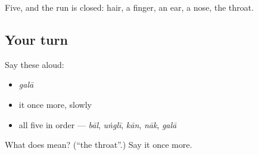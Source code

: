 \begin{grammarlens}[title={What you've built}]
Five, and the run is closed: hair, a finger, an ear, a nose, the throat.
\end{grammarlens}

\subsection*{Your turn}
Say these aloud:

\begin{itemize}
\raggedright
  \item \emph{galā}
  \item it once more, slowly
  \item all five in order — \emph{bāl}, \emph{uṅglī}, \emph{kān}, \emph{nāk}, \emph{galā}
\end{itemize}

\begin{tcolorbox}[breakable,colback=teal!4,colframe=teal!35!black,title={Before you move on}]
What does  mean? (\textquotedblleft{}the throat\textquotedblright{}.) Say it once more.
\end{tcolorbox}
